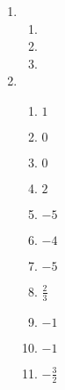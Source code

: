 \documentclass[a4paper]{article}
\begin{document}
\begin{enumerate}
\newpage
\item %
  \begin{enumerate}
  \item  %
  \item  %
  \item  %
  \end{enumerate}

\item %
  \begin{enumerate}
  \item $1$ %
  \item $0$ %
  \item $0$ %
  \item $2$ %
  \item $-5$ %
  \item $-4$ %
  \item $-5$ %
  \item $\frac{2}{3}$ %
  \item $-1$ %
  \item $-1$ %
  \item $-\frac{3}{2}$ %
  \end{enumerate}

\end{enumerate}
\end{document}
